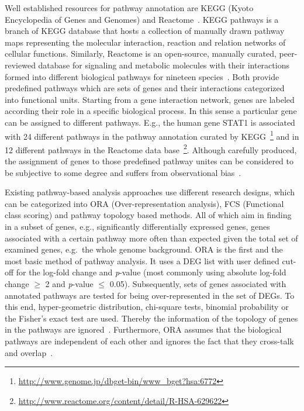 \documentclass[10pt,a4paper,twocolumn]{article}
\begin{document}
Well established resources for pathway annotation are KEGG (Kyoto
Encyclopedia of Genes and Genomes)\cite{Kegg} and
Reactome~\cite{Reactome}. KEGG pathways is a branch of KEGG database that
hosts a collection of manually drawn pathway maps representing the
molecular interaction, reaction and relation networks of cellular
functions. Similarly, Reactome is an open-source, manually curated,
peer-reviewed database for signaling and metabolic molecules with their
interactions formed into different biological pathways for nineteen
species~\cite{Reactome}. Both provide predefined pathways which are sets of
genes and their interactions categorized into functional units. Starting
from a gene interaction network, genes are labeled according their role in
a specific biological process. In this sense a particular gene can be
assigned to different pathways. E.g., the human gene STAT1 is associated
with 24 different pathways in the pathway annotation curated by
KEGG~\footnote{\url{http://www.genome.jp/dbget-bin/www_bget?hsa:6772}} and
in 12 different pathways in the Reactome data
base~\footnote{\url{http://www.reactome.org/content/detail/R-HSA-629622}}.
Although carefully produced, the assignment of genes to those predefined
pathway unites can be considered to be subjective to some degree and
suffers from observational bias~\cite{schnoes2013biases}.

Existing pathway-based analysis approaches use different research designs,
which can be categorized into ORA (Over-representation analysis), FCS
(Functional class scoring) and pathway topology based methods. All of which
aim in finding in a subset of genes, e.g., significantly differentially
expressed genes, genes associated with a certain pathway more often than
expected given the total set of examined genes, e.g.~the whole genome
background.  ORA is the first and the most basic method of pathway
analysis. It uses a DEG list with user defined cut-off for the log-fold
change and \textit{p}-value (most commonly using absolute log-fold change
$\geq$ 2 and \textit{p}-value $\leq$ 0.05). Subsequently, sets of genes
associated with annotated pathways are tested for being over-represented in
the set of DEGs. To this end, hyper-geometric distribution, chi-square
tests, binomial probability or the Fisher’s exact test are used. Thereby
the information of the topology of genes in the pathways are
ignored~\cite{Bayer}. Furthermore, ORA assumes that the biological pathways
are independent of each other and ignores the fact that they cross-talk and
overlap~\cite{Khatri2012,Campos}.
\end{document}
